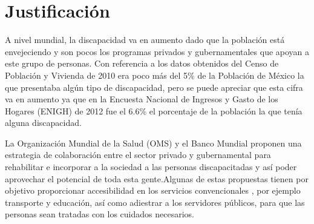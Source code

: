 
\section{Justificación}
A nivel mundial, la discapacidad va en aumento dado que la población está
 envejeciendo y son pocos los programas privados y gubernamentales que apoyan a
 este grupo de personas\cite{OrganizacionMundialdelaSalud2011}. 
 Con referencia a los datos obtenidos del Censo de Población
 y Vivienda de 2010 era poco más del 5\% de la Población de México la que
 presentaba algún tipo de discapacidad, pero se puede apreciar que esta cifra va
 en aumento ya que en la Encuesta Nacional de Ingresos y Gasto de los Hogares
 (ENIGH) de 2012 fue el 6.6\% el porcentaje de la población la que tenía alguna
 discapacidad\cite{Milosavljevic2014}.
 


 
La Organización Mundial de la Salud (OMS) y el Banco Mundial
\cite{OrganizacionMundialdelaSalud2011} proponen una
 estrategia de colaboración entre el sector privado y gubernamental para
 rehabilitar e incorporar a la sociedad a las personas discapacitadas y así
 poder aprovechar el potencial de toda esta gente.Algunas de estas propuestas
 tienen por objetivo proporcionar accesibilidad en los servicios convencionales
 , por ejemplo transporte y educación, así como adiestrar a los servidores
 públicos, para que las personas sean tratadas con los cuidados necesarios.
 